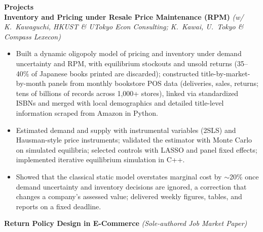 \documentclass[11pt,letterpaper]{article}
\begin{document}
{\large \textbf{Projects}}\\[-0.5pt]
\textbf{Inventory and Pricing under Resale Price Maintenance (RPM)} \textit{(w/ K.\ Kawaguchi, HKUST \& UTokyo Econ Consulting; K.\ Kawai, U.\ Tokyo \& Compass Lexecon)}\\
\vspace{-6pt}
\begin{itemize}
  \item Built a dynamic oligopoly model of pricing and inventory under demand uncertainty and RPM, with equilibrium stockouts and unsold returns (35--40\% of Japanese books printed are discarded); constructed title-by-market-by-month panels from monthly bookstore POS data (deliveries, sales, returns; tens of billions of records across 1{,}000+ stores), linked via standardized ISBNs and merged with local demographics and detailed title-level information scraped from Amazon in Python.
  \item Estimated demand and supply with instrumental variables (2SLS) and Hausman-style price instruments; validated the estimator with Monte Carlo on simulated equilibria; selected controls with LASSO and panel fixed effects; implemented iterative equilibrium simulation in C++.
  \item Showed that the classical static model overstates marginal cost by \(\sim\)20\% once demand uncertainty and inventory decisions are ignored, a correction that changes a company's assessed value; delivered weekly figures, tables, and reports on a fixed deadline.
\end{itemize}
\vspace{-3pt}
\textbf{Return Policy Design in E-Commerce} \textit{(Sole-authored Job Market Paper)}\\
\vspace{-6pt}
\end{document}
